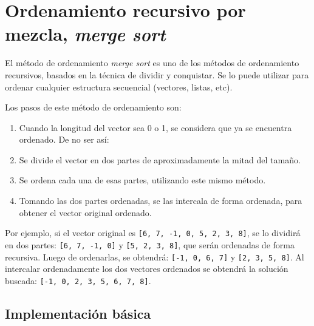 
%

\renewcommand{\chaptermark}[1]{\markboth{#1}{}}
\renewcommand{\thesection}{\arabic{section}}
\chapter*{Ordenamiento recursivo por mezcla, \textit{merge sort}}

El método de ordenamiento \textit{merge sort} es uno de los métodos de
ordenamiento recursivos, basados en la técnica de dividir y conquistar.  Se
lo puede utilizar para ordenar cualquier estructura secuencial (vectores,
listas, etc).

Los pasos de este método de ordenamiento son:
\begin{enumerate}
\item Cuando la longitud del vector sea 0 o 1, se considera que ya se
encuentra ordenado. De no ser así:
\item Se divide el vector en dos partes de aproximadamente la mitad del
tamaño.
\item Se ordena cada una de esas partes, utilizando este mismo método.
\item Tomando las dos partes ordenadas, se las intercala de forma ordenada,
para obtener el vector original ordenado.
\end{enumerate}

Por ejemplo, si el vector original es \verb+[6, 7, -1, 0, 5, 2, 3, 8]+, se
lo dividirá en dos partes: \verb+[6, 7, -1, 0]+ y \verb+[5, 2, 3, 8]+, que
serán ordenadas de forma recursiva.  Luego de ordenarlas, se obtendrá:
\verb+[-1, 0, 6, 7]+ y \verb+[2, 3, 5, 8]+.  Al intercalar ordenadamente
los dos vectores ordenados se obtendrá la solución buscada:
\verb+[-1, 0, 2, 3, 5, 6, 7, 8]+.

\section{Implementación básica}

